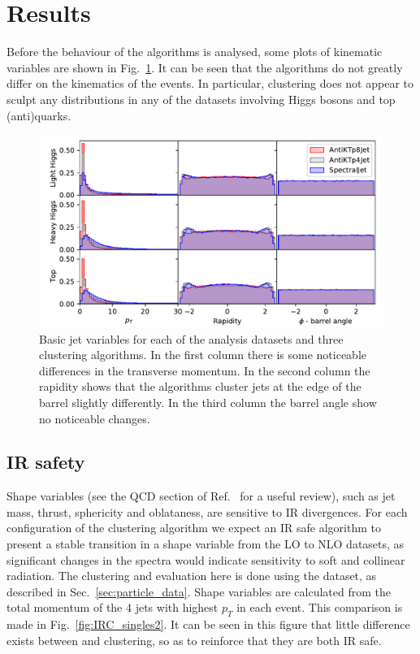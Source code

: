 \section{Results}

Before the behaviour of the algorithms is analysed, some plots of kinematic variables are shown
in Fig.~\ref{fig:kinematics}.
It can be seen that the algorithms do not greatly differ on the kinematics of the events.
In particular, \spectral{} clustering does not appear to sculpt any distributions in any of the datasets involving Higgs bosons and top (anti)quarks.


\begin{figure}[htp]
    \begin{center}
    \includegraphics[width=\textwidth]{graphics/kinematics}
        \caption{Basic jet variables for each of the analysis datasets and three clustering algorithms.
            In the first column there is some noticeable differences in the transverse momentum.
            In the second column the rapidity shows that
            the algorithms cluster jets at the edge of the barrel slightly differently.
            In the third column the barrel angle show no noticeable changes.
        }\label{fig:kinematics}
\end{center}
\end{figure}

\subsection{IR safety}
Shape variables (see the QCD section of Ref.~\cite{Altarelli:1989hv} for a useful review), such as jet mass, thrust, sphericity and oblataness,  are sensitive to IR divergences.
For each configuration of the clustering algorithm we expect an IR safe algorithm to present a stable transition
in a shape variable from the LO to NLO datasets, as significant
changes in the spectra would indicate sensitivity to soft and collinear radiation.
The clustering and evaluation here is done using the  dataset, as described in Sec.~\ref{sec:particle_data}.
Shape variables are calculated from the total momentum of the 4 jets with highest \(p_T\) in each event.
This comparison is made in Fig.~\ref{fig:IRC_singles2}.
It can be seen in this figure that little difference exists between \genkt{} and \spectral{} clustering, so as to reinforce that they are both IR safe.

